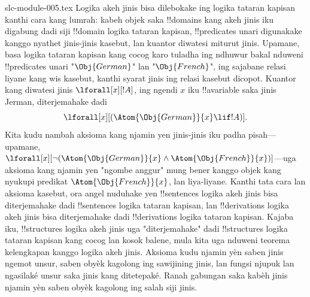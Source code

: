 \begin{filecontents*}[overwrite]{slc-module-005.tex}
Logika akeh jinis bisa dilebokake ing logika tataran
kapisan kanthi cara kang lumrah: kabeh
objek saka !!{domain}s kang akeh jinis iku
digabung dadi siji !!{domain} logika tataran kapisan,
!!{predicate}s unari digunakake kanggo
nyathet jinis-jinis kasebut, lan kuantor
diwatesi miturut jinis. Upamane, basa
logika tataran kapisan kang cocog karo tuladha
ing ndhuwur bakal nduweni !!{predicate}s
unari "$\Obj{German}$" lan "$\Obj{French}$",
ing sajabane relasi liyane kang wis kasebut,
kanthi syarat jinis ing relasi kasebut dicopot.
Kuantor kang diwatesi jinis
$\lforall[x][!A]$, ing ngendi $x$ iku
!!a{variable} saka jinis Jerman, diterjemahake dadi
\[
\lforall[x][(\Atom{\Obj{German}}{x} \lif !A)].
\]
Kita kudu nambah aksioma kang njamin
yen jinis-jinis iku padha pisah---upamane,
$\lforall[x][\lnot (\Atom{\Obj{German}}{x} \land
  \Atom{\Obj{French}}{x})]$---uga aksioma
kang njamin yen "ngombe anggur" mung bener
kanggo objek kang nyukupi predikat
$\Atom{\Obj{French}}{x}$, lan liya-liyane.
Kanthi tata cara lan aksioma kasebut,
ora angel nuduhake yen !!{sentence}s
logika akeh jinis bisa diterjemahake
dadi !!{sentence}s logika tataran kapisan,
lan !!{derivation}s logika akeh jinis
bisa diterjemahake dadi !!{derivation}s
logika tataran kapisan. Kajaba iku,
!!{structure}s logika akeh jinis uga
"diterjemahake" dadi !!{structure}s
logika tataran kapisan kang cocog lan
kosok balene, mula kita uga nduweni
teorema kelengkapan kanggo logika
akeh jinis. Aksioma kudu njamin yèn saben jinis ngemot unsur, saben obyèk kagolong ing sawijining jinis, lan fungsi njupuk lan ngasilaké unsur saka jinis kang ditetepaké. Ranah gabungan saka kabèh jinis njamin yèn saben obyèk kagolong ing salah siji jinis.


\end{filecontents*}

